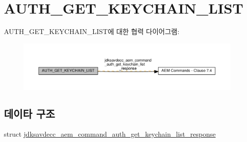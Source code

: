 \hypertarget{group__command__auth__get__keychain__list__response}{}\section{A\+U\+T\+H\+\_\+\+G\+E\+T\+\_\+\+K\+E\+Y\+C\+H\+A\+I\+N\+\_\+\+L\+I\+ST}
\label{group__command__auth__get__keychain__list__response}
A\+U\+T\+H\+\_\+\+G\+E\+T\+\_\+\+K\+E\+Y\+C\+H\+A\+I\+N\+\_\+\+L\+I\+S\+T에 대한 협력 다이어그램\+:
\nopagebreak
\begin{figure}[H]
\begin{center}
\leavevmode
\includegraphics[width=350pt]{group__command__auth__get__keychain__list__response}
\end{center}
\end{figure}
\subsection*{데이타 구조}
\begin{DoxyCompactItemize}
\item 
struct \hyperlink{structjdksavdecc__aem__command__auth__get__keychain__list__response}{jdksavdecc\+\_\+aem\+\_\+command\+\_\+auth\+\_\+get\+\_\+keychain\+\_\+list\+\_\+response}
\end{DoxyCompactItemize}
